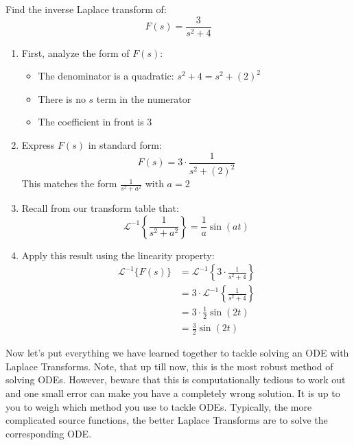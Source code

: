 \exampleline
\begin{example}
Find the inverse Laplace transform of:
\[
F(s) = \frac{3}{s^2 + 4}
\]

\begin{solution}
\begin{enumerate}
\item First, analyze the form of $F(s)$:
   \begin{itemize}
      \item The denominator is a quadratic: $s^2 + 4 = s^2 + (2)^2$
      \item There is no $s$ term in the numerator
      \item The coefficient in front is 3
   \end{itemize}

\item Express $F(s)$ in standard form:
   \[
   F(s) = 3 \cdot \frac{1}{s^2 + (2)^2}
   \]
   This matches the form $\frac{1}{s^2 + a^2}$ with $a = 2$

\item Recall from our transform table that:
   \[
   \mathcal{L}^{-1}\left\{\frac{1}{s^2 + a^2}\right\} = \frac{1}{a}\sin(at)
   \]

\item Apply this result using the linearity property:
   \begin{align*}
   \mathcal{L}^{-1}\{F(s)\} &= \mathcal{L}^{-1}\left\{3 \cdot \frac{1}{s^2 + 4}\right\} \\
   &= 3 \cdot \mathcal{L}^{-1}\left\{\frac{1}{s^2 + 4}\right\} \\
   &= 3 \cdot \frac{1}{2}\sin(2t) \\
   &= \frac{3}{2}\sin(2t)
   \end{align*}
\end{enumerate}

\end{solution}
\end{example}
\exampleline

\noindent Now let's put everything we have learned together to tackle solving an ODE with Laplace Transforms. Note, that up till now, this is the most robust method of solving ODEs. However, beware that this is computationally tedious to work out and one small error can make you have a completely wrong solution. It is up to you to weigh which method you use to tackle ODEs. Typically, the more complicated source functions, the better Laplace Transforms are to solve the corresponding ODE.


